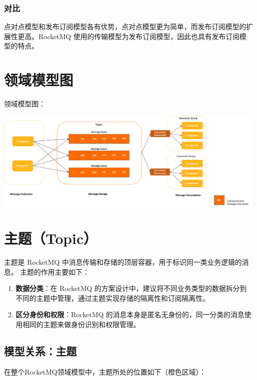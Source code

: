 \documentclass[11pt, a4paper, oneside, fontset=none]{ctexbook}
\begin{document}
\subsubsection{对比}
点对点模型和发布订阅模型各有优势，点对点模型更为简单，而发布订阅模型的扩展性更高。RocketMQ 使用的传输模型为发布订阅模型，因此也具有发布订阅模型的特点。

\section*{领域模型图}
领域模型图：
\begin{center}
  \begin{minipage}{\textwidth}
    \center
    \includegraphics[width=\textwidth]{picture/领域模型图.png}
    \captionsetup{hypcap=false}
    \label{fig:领域模型图}
  \end{minipage}
\end{center}
\section{主题（Topic）}
主题是 RocketMQ 中消息传输和存储的顶层容器，用于标识同一类业务逻辑的消息。
主题的作用主要如下：
\begin{enumerate}
  \item {\bfseries\kaishu 数据分类}：在 RocketMQ 的方案设计中，建议将不同业务类型的数据拆分到不同的主题中管理，通过主题实现存储的隔离性和订阅隔离性。
  \item {\bfseries\kaishu 区分身份和权限}：RocketMQ 的消息本身是匿名无身份的，同一分类的消息使用相同的主题来做身份识别和权限管理。
\end{enumerate}

\subsection{模型关系：主题}
在整个RocketMQ领域模型中，主题所处的位置如下（橙色区域）：
\end{document}
